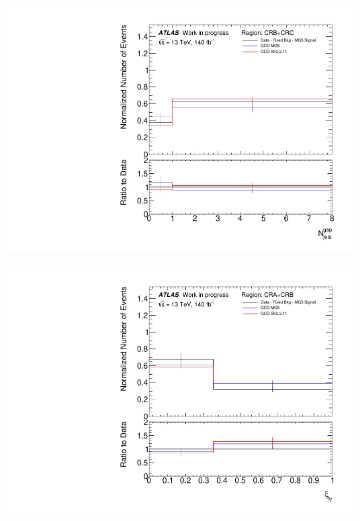 \begin{figure}[t]
  \begin{subfigure}[b]{0.48\textwidth}
    \centering
    \includegraphics[width=\textwidth]{plots/diffx/biastest_13Feb_mgsignal_twobins_N_gapjets.pdf}
    \caption{\label{biasa}}
  \end{subfigure}
  \hfill
  \begin{subfigure}[b]{0.48\textwidth}
    \centering
    \includegraphics[width=\textwidth]{plots/diffx/biastest_13Feb_mgsignal_twobins_ly_centrality.pdf}
    \caption{\label{biasb}}
  \end{subfigure}
  \hfill
  \begin{subfigure}[b]{0.48\textwidth}
    \centering

\end{subfigure}
\end{figure}
